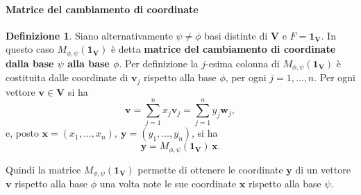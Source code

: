 \documentclass{article}
\theoremstyle{plain}
\theoremstyle{definition}
\newtheorem{defn}{Definizione}[section]
\theoremstyle{remark}
\begin{document}
\vspace{10pt}

\paragraph{Matrice del cambiamento di coordinate}
\begin{bxthm}
\begin{defn}
Siano alternativamente $\psi\neq\phi$ basi distinte di $\mathbf{V}$ e $F = \mathbf{1_V}$. 
In questo caso $M_{\phi,\psi}(\mathbf{1_V})$ è detta \textbf{matrice del cambiamento di coordinate dalla base $\psi$ alla base $\phi$}.
Per definizione la $j$-esima colonna di $M_{\phi,\psi}(\mathbf{1_V})$ è costituita dalle coordinate di $\mathbf{v}_j$ rispetto alla base $\phi$, per ogni $j = 1, \dots, n$. 
Per ogni vettore $\mathbf{v} \in \mathbf{V}$ si ha
\[
\mathbf{v} = \sum_{j=1}^{n}x_j \mathbf{v}_j = \sum_{j=1}^{n}y_j \mathbf{w}_j,
\]
e, posto $\mathbf{x} = (x_1, \dots, x_n),\ \mathbf{y} = (y_1, \dots, y_n)$, si ha
\[
\mathbf{y} = M_{\phi,\psi}(\mathbf{1_V}) \, \mathbf{x}.
\]    
\end{defn}
\end{bxthm}

\vspace{10pt}

Quindi la matrice $M_{\phi,\psi}(\mathbf{1_V})$ permette di ottenere le coordinate $\mathbf{y}$ di un vettore $\mathbf{v}$ rispetto alla base $\phi$ una volta note le sue coordinate $\mathbf{x}$ rispetto alla base $\psi$.

\vspace{10pt}
\end{document}
